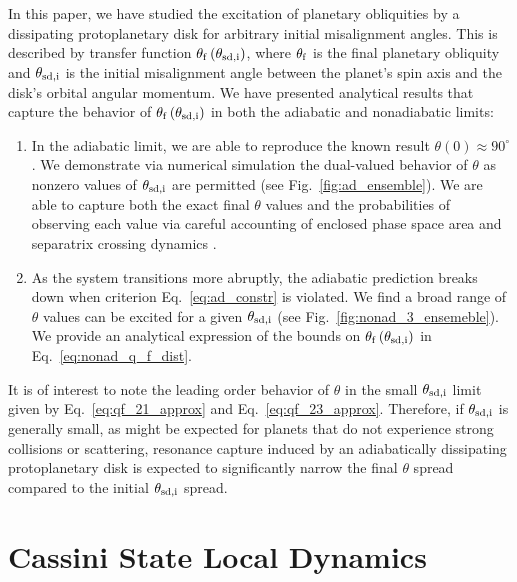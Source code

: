 \documentclass[
        fleqn,
        usenatbib,
        referee,
    ]{mnras}
\newcommand*{\p}[1]{\left(#1\right)}
\begin{document}
In this paper, we have studied the excitation of planetary obliquities by a
dissipating protoplanetary disk for arbitrary initial misalignment angles. This
is described by transfer function $\theta_{\rm f}\p{\theta_{\rm sd, i}}$, where
$\theta_{\rm f}$ is the final planetary obliquity and $\theta_{\rm sd, i}$ is
the initial misalignment angle between the planet's spin axis and the disk's
orbital angular momentum. We have presented analytical results that capture the
behavior of $\theta_{\rm f}\p{\theta_{\rm sd, i}}$ in both the adiabatic and
nonadiabatic
limits:
\begin{enumerate}
    \item In the adiabatic limit, we are able to reproduce the known result
        $\theta(0) \approx 90^\circ$ \citep{millholland_disk}. We demonstrate
        via numerical simulation the dual-valued behavior of $\theta$ as nonzero
        values of $\theta_{\rm sd, i}$ are permitted (see
        Fig.~\ref{fig:ad_ensemble}). We are able to capture both the exact final
        $\theta$ values and the probabilities of observing each value via
        careful accounting of enclosed phase space area and separatrix crossing
        dynamics \citep{henrard1982,henrard1987}.

    \item As the system transitions more abruptly, the adiabatic prediction
        breaks down when criterion Eq.~\eqref{eq:ad_constr} is violated. We find a
        broad range of $\theta$ values can be excited for a given $\theta_{\rm
        sd, i}$ (see Fig.~\ref{fig:nonad_3_ensemeble}). We provide an analytical
        expression of the bounds on $\theta_{\rm f}\p{\theta_{\rm sd, i}}$ in
        Eq.~\eqref{eq:nonad_q_f_dist}.
\end{enumerate}

It is of interest to note the leading order behavior of $\theta$ in the small
$\theta_{\rm sd, i}$ limit given by Eq.~\eqref{eq:qf_21_approx} and
Eq.~\eqref{eq:qf_23_approx}. Therefore, if $\theta_{\rm sd, i}$ is generally
small, as might be expected for planets that do not experience strong collisions
or scattering, resonance capture induced by an adiabatically dissipating
protoplanetary disk is expected to significantly narrow the final $\theta$
spread compared to the initial $\theta_{\rm sd, i}$ spread.




\appendix

\section{Cassini State Local Dynamics}\label{s:local_dynamics}
\end{document}
